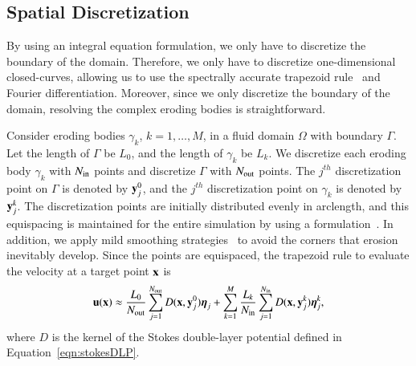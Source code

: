 \documentclass[preprint, 10pt]{elsarticle}
\begin{document}
\subsection{Spatial Discretization}
\label{s:spatialDiscretization}
By using an integral equation formulation, we only have to discretize
the boundary of the domain.  Therefore, we only have to discretize
one-dimensional closed-curves, allowing us to use the spectrally
accurate trapezoid rule~\cite{tre-wei2014} and Fourier differentiation.
Moreover, since we only discretize the boundary of the domain, resolving
the complex eroding bodies is straightforward.

Consider eroding bodies $\gamma_k$, $k=1,\ldots,M$, in a fluid domain
$\Omega$ with boundary $\Gamma$.  Let the length of $\Gamma$ be $L_{0}$,
and the length of $\gamma_k$ be $L_k$.  We discretize each eroding body
$\gamma_k$ with $N_{\mathrm{in}}$ points and discretize $\Gamma$ with $N_{\mathrm{out}}$
points.  The $j^{th}$ discretization point on $\Gamma$ is denoted by
${\mathbf{y}}_j^0$, and the $j^{th}$ discretization point on $\gamma_k$ is
denoted by ${\mathbf{y}}^k_j$.  The discretization points are initially
distributed evenly in arclength, and this equispacing is maintained for
the entire simulation by using a {\thL}
formulation~\cite{hou-low-she1994}.  In addition, we apply mild
smoothing strategies~\cite{qua-moo2018} to avoid the corners that
erosion inevitably develop.    Since the points are equispaced, the
trapezoid rule to evaluate the velocity at a target point ${\mathbf{x}}$ is
\begin{align}
  \label{eqn:trap}
  {\mathbf{u}}({\mathbf{x}}) \approx \frac{L_0}{N_{\mathrm{out}}} \sum_{j=1}^{N_{\mathrm{out}}} 
    D({\mathbf{x}},{\mathbf{y}}^0_j) {\boldsymbol\eta}_j +
  \sum_{k=1}^M \frac{L_k}{N_{\mathrm{in}}} \sum_{j=1}^{N_{\mathrm{in}}}
    D({\mathbf{x}},{\mathbf{y}}^k_j) {\boldsymbol\eta}^k_j,
\end{align}
where $D$ is the kernel of the Stokes double-layer potential defined in
Equation~\eqref{eqn:stokesDLP}.
\end{document}
